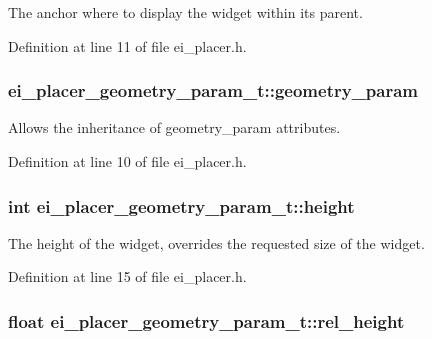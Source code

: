 The anchor where to display the widget within its parent. 



Definition at line 11 of file ei\+\_\+placer.\+h.

\hypertarget{structei__placer__geometry__param__t_ac4fbf1c623a149e51297d6bad1550ff2}{
\subsubsection[{geometry\+\_\+param}]{ ei\+\_\+placer\+\_\+geometry\+\_\+param\+\_\+t\+::geometry\+\_\+param}}\label{structei__placer__geometry__param__t_ac4fbf1c623a149e51297d6bad1550ff2}


Allows the inheritance of geometry\+\_\+param attributes. 



Definition at line 10 of file ei\+\_\+placer.\+h.

\hypertarget{structei__placer__geometry__param__t_a618ac597262e097151de37f8388e2b67}{
\subsubsection[{height}]{\setlength{\rightskip}{0pt plus 5cm}int ei\+\_\+placer\+\_\+geometry\+\_\+param\+\_\+t\+::height}}\label{structei__placer__geometry__param__t_a618ac597262e097151de37f8388e2b67}


The height of the widget, overrides the requested size of the widget. 



Definition at line 15 of file ei\+\_\+placer.\+h.

\hypertarget{structei__placer__geometry__param__t_aa2a20632f767399e71b3c4ce25ab756a}{
\subsubsection[{rel\+\_\+height}]{\setlength{\rightskip}{0pt plus 5cm}float ei\+\_\+placer\+\_\+geometry\+\_\+param\+\_\+t\+::rel\+\_\+height}}\label{structei__placer__geometry__param__t_aa2a20632f767399e71b3c4ce25ab756a}


